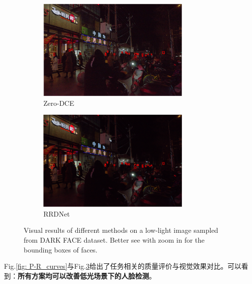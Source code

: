 \documentclass[letterpaper,12pt]{article}
\begin{document}
\begin{figure}[htbp]
\begin{subfigure}{0.22\textwidth}
			\includegraphics[width=\linewidth]{DARK_FACE/Zero-DCE}
			\captionsetup{font=scriptsize}
			\caption{Zero-DCE}
			\label{fig: DARK_FACE_k}  
		\end{subfigure}
		\begin{subfigure}{0.22\textwidth}
			\includegraphics[width=\linewidth]{DARK_FACE/RRDNet}
			\captionsetup{font=scriptsize}
			\caption{RRDNet}
			\label{fig: DARK_FACE_l}  
		\end{subfigure}
		
		\captionsetup{font=scriptsize}
		\caption{
			\label{fig: Visual Result from DARK_FACE dataset}
			Visual results of different methods on a low-light image sampled from DARK FACE dataset. Better see with zoom in for the bounding boxes of faces.
		}
	\end{figure}
	
	Fig.\ref{fig: P-R_curves}与Fig.\ref{fig: Visual Result from DARK_FACE dataset}给出了任务相关的质量评价与视觉效果对比。可以看到：\textbf{所有方案均可以改善低光场景下的人脸检测}。
	
\end{document}
